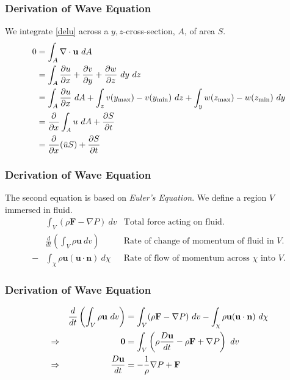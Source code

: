 \documentclass[xcolor=dvipsnames]{beamer}
\begin{document}
\begin{frame}
\frametitle{Derivation of Wave Equation}
We integrate \eqref{delu} across a $y,z$-cross-section, $A$, of area $S$.
\begin{align}
0 &= \int_{A} \nabla \cdot \textbf{u} \ dA \notag\\
&= \int_{A} \frac{\partial u}{\partial x} + \frac{\partial v}{\partial y} + \frac{\partial w}{\partial z} \ dy \ dz \notag\\
&= \int_A \frac{\partial u}{\partial x} \ dA +\int_z v(y_{\max})-v(y_{\min}) \ dz + \int_y w(z_{\max}) - w(z_{\min})\ dy \notag\\
&= \frac{\partial}{\partial x} \int_A u \ dA + \frac{\partial S}{\partial t} \notag\\
\label{swe1} &= \frac{\partial}{\partial x} (\bar{u}S) +  \frac{\partial S}{\partial t}
\end{align}
\end{frame}

\begin{frame}
\frametitle{Derivation of Wave Equation}
The second equation is based on \textit{Euler's Equation}.  We define a region $V$ immersed in fluid.
\begin{align*}
&\int_{V} (\rho \textbf{F} - \nabla P) \ dv & \text{Total force acting on fluid.}\\
&\frac{d}{dt} \left( \int_{V} \rho \textbf{u} \ dv \right) & \text{Rate of change of momentum of fluid in $V$.}\\
-& \int_{\chi} \rho \textbf{u}(\textbf{u}\cdot \textbf{n}) \ d\chi & \text{Rate of flow of momentum across $\chi$ into $V$.}
\end{align*}
\end{frame}

\begin{frame}
\frametitle{Derivation of Wave Equation}
\begin{align}
&&\frac{d}{dt} \left( \int_{V} \rho\textbf{u} \ dv \right) &= \int_{V} ( \rho \textbf{F} - \nabla P) \ dv - \int_{\chi} \rho \textbf{u}(\textbf{u}\cdot \textbf{n}) \ d\chi \notag\\
&\Rightarrow
& \textbf{0} &= \int_{V} \left( \rho \frac{D\textbf{u}}{dt} - \rho \textbf{F} + \nabla P \right) \ dv \notag\\
&\Rightarrow
&\frac{D\textbf{u}}{dt} &= - \frac{1}{\rho} \nabla P + \label{eulers} \textbf{F} 
\end{align}
\end{frame}
\end{document}
